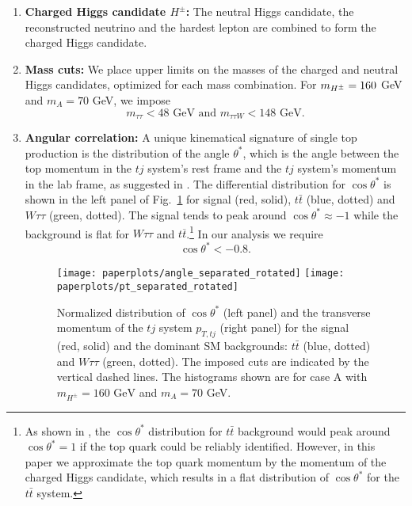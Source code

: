 \begin{enumerate}
\item \textbf{Charged Higgs candidate $H^{\pm}$:} The   neutral Higgs candidate, the reconstructed neutrino and the hardest lepton  are combined to form the charged Higgs candidate. 

\item \textbf{Mass cuts:} We place upper limits on the masses of the charged and neutral Higgs candidates, optimized for each mass combination.  For $m_{H^{\pm}}=160$ GeV and $m_{A}= 70$ GeV, we impose 
\begin{equation}
m_{\tau\tau} < 48  \text{ GeV and } m_{\tau\tau W} < 148 \text{ GeV.}
\label{eqMASS}
\end{equation}
 

 \item \textbf{Angular correlation:} A unique kinematical signature of single top production is the distribution of the angle $\theta^{*}$, which is the angle between the top momentum in the $tj$ system's rest frame and the $tj$ system's momentum in the lab frame, as suggested in \cite{Kling:2012up}. The differential distribution for $\cos\theta^{*}$  is shown in the left panel of Fig.~\ref{fig:fig3} for signal (red, solid), $t\bar{t}$ (blue, dotted) and $W\tau\tau$ (green, dotted). The signal tends to peak around $\cos\theta^* \approx -1$ while the background is   flat for $W\tau\tau$ and $t\overline{t}$.\footnote{As shown in \cite{Kling:2012up}, the $\cos\theta^{*}$ distribution for $t\bar{t}$ background would peak around $\cos\theta^{*}=1$ if the top quark could be reliably identified.   However, in this paper we approximate the top quark momentum by the momentum of the charged Higgs candidate, which results in a flat distribution of $\cos\theta^*$ for the $t\bar{t}$ system.  }   In our analysis we require  
\begin{equation}
 \cos\theta^*<  -0.8.
\label{eqT}
\end{equation}

\begin{figure}[htbp]
\centering
\texttt{[image: paperplots/angle\_separated\_rotated]}\hfill
 \texttt{[image: paperplots/pt\_separated\_rotated]}
 \caption{Normalized distribution of $\cos\theta^*$ (left  panel) and the transverse momentum of the $tj$ system $p_{T,tj}$ (right panel) for the signal (red, solid) and the dominant SM backgrounds: $t\bar{t}$ (blue, dotted)  and $W\tau\tau$ (green, dotted). The imposed cuts are indicated by the vertical dashed lines. The histograms shown are for case A with $m_{H^{\pm}}=160\text{ GeV}$ and $m_A=70$ GeV.}
\label{fig:fig3}
\end{figure}


\end{enumerate}
